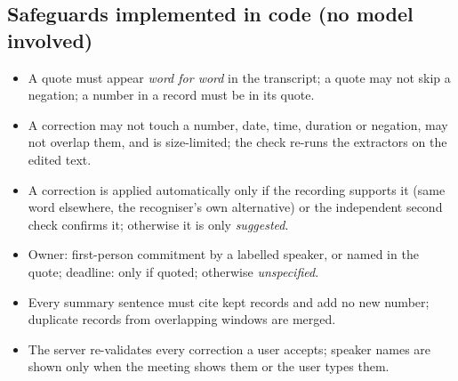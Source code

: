 \documentclass[10pt,a4paper]{article}
\begin{document}
\subsection{Safeguards implemented in code (no model involved)}
\begin{itemize}
\item A quote must appear \emph{word for word} in the transcript; a quote may not skip a negation; a number in a record must be in its quote.
\item A correction may not touch a number, date, time, duration or negation, may not overlap them, and is size-limited; the check re-runs the extractors on the edited text.
\item A correction is applied automatically only if the recording supports it (same word elsewhere, the recogniser's own alternative) or the independent second check confirms it; otherwise it is only \emph{suggested}.
\item Owner: first-person commitment by a labelled speaker, or named in the quote; deadline: only if quoted; otherwise \emph{unspecified}.
\item Every summary sentence must cite kept records and add no new number; duplicate records from overlapping windows are merged.
\item The server re-validates every correction a user accepts; speaker names are shown only when the meeting shows them or the user types them.
\end{itemize}
\end{document}

